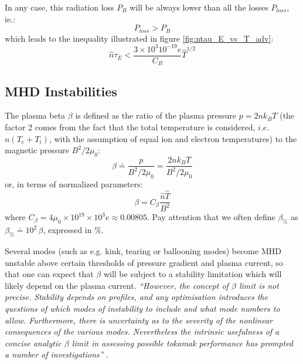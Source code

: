 In any case, this radiation loss $P_B$ will be always lower than all the losses $P_{loss}$, ie.:
\begin{equation*}
	P_{loss} > P_B
\end{equation*}
which leads to the inequality illustrated in figure \ref{fig:ntau_E_vs_T_adv}:
\begin{equation}
	\hat n \tau_E < \frac{3\times 10^3 10^{-19} e }{C_B} \hat T^{1/2}
\end{equation}


\subsection{MHD Instabilities}
The plasma beta $\beta$ is defined as the ratio of the plasma pressure $p=2nk_BT$ (the factor 2 comes from the fact that the total temperature is considered, $i.e.$ $n(T_e+T_i)$, with the assumption of equal ion and electron temperatures) to the magnetic pressure $B^2/2\mu_0$:
\begin{equation}
	\beta
	\doteq 
	\frac{p}{B^2/2\mu_0}
	=
	\frac{2 n k_B T}{B^2/2\mu_0}
\end{equation}
or, in terms of normalized parameters:
\begin{equation}
	\beta
	=
	C_\beta \frac{\hat n \hat T}{B^2}
\label{eqn:beta_adv}
\end{equation}
where $C_\beta = 4\mu_0\times 10^{19}\times 10^3 e \approx 0.00805$. Pay attention that we often define $\beta_\%$ as $\beta_\% \doteq 10^2\, \beta$,  expressed in $\%$.


Several modes (such as e.g. kink, tearing or ballooning modes) become MHD unstable above certain thresholds of pressure gradient and plasma current, so that one can expect that $\beta$ will be subject to a stability limitation which will likely depend on the plasma current. \emph{``However, the concept of $\beta$ limit is not precise. Stability depends on profiles, and any optimisation introduces the questions of which modes of instability to include and what mode numbers to allow. Furthermore, there is uncertainty as to the severity of the nonlinear consequences of the various modes. Nevertheless the intrinsic usefulness of a concise analytic $\beta$ limit in assessing possible tokamak performance has prompted a number of investigations''} .

